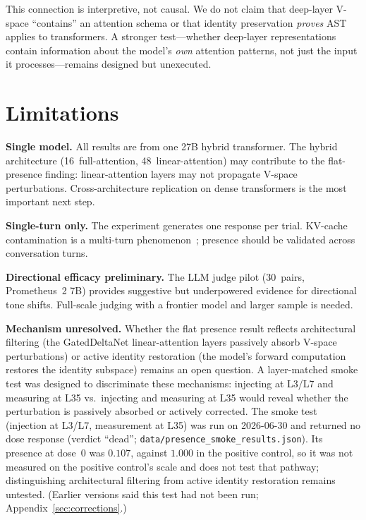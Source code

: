\documentclass[11pt,a4paper]{article}
\begin{document}
This connection is interpretive, not causal. We do not claim that deep-layer
V-space ``contains'' an attention schema or that identity preservation
\emph{proves} AST applies to transformers. A stronger test---whether
deep-layer representations contain information about the model's \emph{own}
attention patterns, not just the input it processes---remains designed but
unexecuted.

\section{Limitations}
\label{sec:limitations}

\textbf{Single model.} All results are from one 27B hybrid transformer.
The hybrid architecture (16~full-attention, 48~linear-attention) may
contribute to the flat-presence finding: linear-attention layers
may not propagate V-space perturbations. Cross-architecture replication on
dense transformers is the most important next step.

\textbf{Single-turn only.} The experiment generates one response per trial.
KV-cache contamination is a multi-turn
phenomenon~\citep{kang2026promptactivation}; presence should be validated
across conversation turns.

\textbf{Directional efficacy preliminary.} The LLM judge pilot (30~pairs,
Prometheus~2 7B) provides suggestive but underpowered evidence for
directional tone shifts. Full-scale judging with a frontier model and
larger sample is needed.

\textbf{Mechanism unresolved.}
Whether the flat presence result reflects architectural filtering (the
GatedDeltaNet linear-attention layers passively absorb V-space
perturbations) or active identity restoration (the model's forward
computation restores the identity subspace) remains an open question.
A layer-matched smoke test was designed to discriminate these mechanisms:
injecting at L3/L7 and measuring at L35 vs.\ injecting and measuring at
L35 would reveal whether the perturbation is passively absorbed or
actively corrected. The smoke test (injection at L3/L7, measurement at
L35) was run on 2026-06-30 and returned no dose response (verdict
``dead''; \texttt{data/presence\_smoke\_results.json}). Its presence at
dose~0 was $0.107$, against $1.000$ in the positive control, so it was
not measured on the positive control's scale and does not test that
pathway; distinguishing architectural filtering from active identity
restoration remains untested. (Earlier versions said this test had not
been run; Appendix~\ref{sec:corrections}.)
\end{document}
